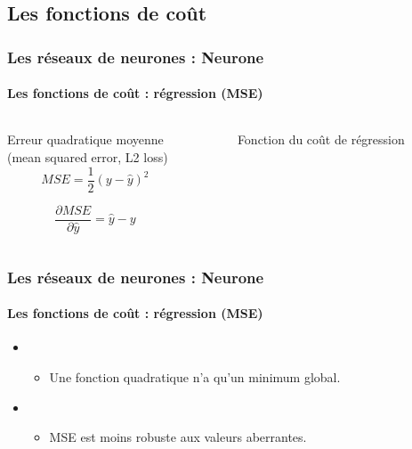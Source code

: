 \documentclass[xcolor=table]{beamer}
\begin{document}
\subsection{Les fonctions de coût}

\begin{frame}
\frametitle{Les réseaux de neurones : Neurone}
\framesubtitle{Les fonctions de coût : régression (MSE)}

\begin{columns}
	\begin{column}{.68\linewidth}
		\begin{block}{Erreur quadratique moyenne \\(mean squared error, L2 loss)}
			\[MSE = \frac{1}{2} (y - \hat{y})^2\]
			
			\[
			\frac{\partial MSE}{\partial \hat{y}} = \hat{y} - y
			\]
		\end{block}
		
	\end{column}%
	\begin{column}{.3\linewidth}
		\begin{figure}
			\caption{Fonction du coût de régression \cite{2017-rosenberg}}
		\end{figure}
	\end{column}
\end{columns}


\end{frame}

\begin{frame}
\frametitle{Les réseaux de neurones : Neurone}
\framesubtitle{Les fonctions de coût : régression (MSE)}

\begin{itemize}
	\item {}
	\begin{itemize}
		\item Une fonction quadratique n'a qu'un minimum global.
	\end{itemize}
	\item {}
	\begin{itemize}
		\item MSE est moins robuste aux valeurs aberrantes.
	\end{itemize}
\end{itemize}

\end{frame}
\end{document}
